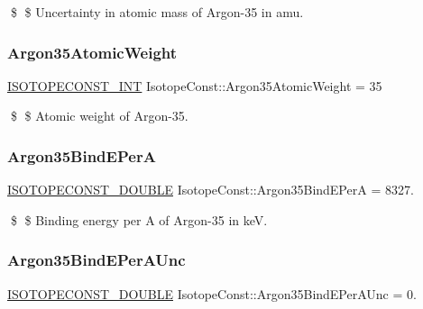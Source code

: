 \$ \$ Uncertainty in atomic mass of Argon-\/35 in amu. \mbox{\label{group___isotope_const-_argon-_ar35_gae8e5af63e446e1eb3bf2d85da6b56848}} 
\subsubsection{\texorpdfstring{Argon35\+Atomic\+Weight}{Argon35AtomicWeight}}
{\footnotesize\ttfamily \mbox{\hyperlink{group___isotope_const-_macros_ga5f18360b3e99483a35c32d789e62621c}{I\+S\+O\+T\+O\+P\+E\+C\+O\+N\+S\+T\+\_\+\+I\+NT}} Isotope\+Const\+::\+Argon35\+Atomic\+Weight = 35}

\$ \$ Atomic weight of Argon-\/35. \mbox{\label{group___isotope_const-_argon-_ar35_ga59e69a092c1a6ca4555922aba5d26037}} 
\subsubsection{\texorpdfstring{Argon35\+Bind\+E\+PerA}{Argon35BindEPerA}}
{\footnotesize\ttfamily \mbox{\hyperlink{group___isotope_const-_macros_ga8f45a7272ce02c0b4c65c44636ed719a}{I\+S\+O\+T\+O\+P\+E\+C\+O\+N\+S\+T\+\_\+\+D\+O\+U\+B\+LE}} Isotope\+Const\+::\+Argon35\+Bind\+E\+PerA = 8327.}

\$ \$ Binding energy per A of Argon-\/35 in keV. \mbox{\label{group___isotope_const-_argon-_ar35_ga73ec9e677d83552eda4f56dd80421ff4}} 
\subsubsection{\texorpdfstring{Argon35\+Bind\+E\+Per\+A\+Unc}{Argon35BindEPerAUnc}}
{\footnotesize\ttfamily \mbox{\hyperlink{group___isotope_const-_macros_ga8f45a7272ce02c0b4c65c44636ed719a}{I\+S\+O\+T\+O\+P\+E\+C\+O\+N\+S\+T\+\_\+\+D\+O\+U\+B\+LE}} Isotope\+Const\+::\+Argon35\+Bind\+E\+Per\+A\+Unc = 0.}

